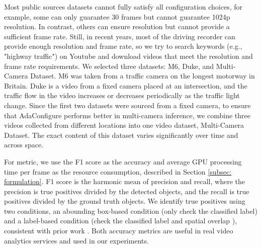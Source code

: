 Most public sources datasets cannot fully satisfy all configuration choices, for example, some can only guarantee 30 frames but cannot guarantee 1024p resolution. In contrast, others can ensure resolution but cannot provide a sufficient frame rate. Still, in recent years, most of the driving recorder can provide enough resolution and frame rate, so we try to search keywords (e.g., "highway traffic") on Youtube and download videos that meet the resolution and frame rate requirements. We selected three datasets: M6, Duke, and Multi-Camera Dataset. M6 was taken from a traffic camera on the longest motorway in Britain. Duke is a video from a fixed camera placed at an intersection, and the traffic flow in the video increases or decreases periodically as the traffic light change. Since the first two datasets were sourced from a fixed camera, to ensure that AdaConfigure performs better in multi-camera inference, we combine three videos collected from different locations into one video dataset, Multi-Camera Dataset. The exact content of this dataset varies significantly over time and across space.

For metric, we use the F1 score as the accuracy and average GPU processing time per frame as the resource consumption, described in Section \ref{subsec: formulation}. F1 score
is the harmonic mean of precision and recall, where the precision is true positives divided by the detected objects, and the recall is true positives divided by the ground truth objects. We identify true positives using two conditions, an abounding box-based condition (only check the classified label) and a label-based condition (check the classified label and spatial overlap \cite{overlap}), consistent with prior work \cite{jiang2018chameleon,noscope}. Both accuracy metrics are useful in real video analytics services and used in our experiments.

